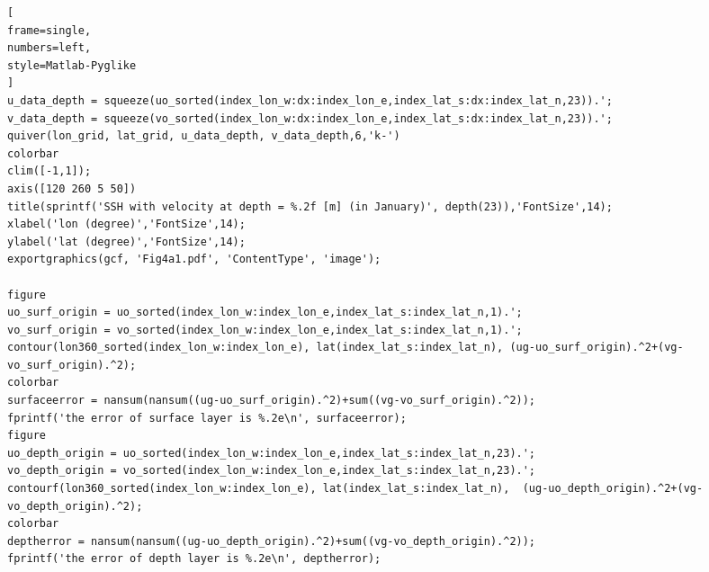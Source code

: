 \documentclass[12pt]{article}
\begin{document}
\begin{CJK*}{UTF8}{bsmi}
\begin{lstlisting}[
frame=single,
numbers=left,
style=Matlab-Pyglike
]
u_data_depth = squeeze(uo_sorted(index_lon_w:dx:index_lon_e,index_lat_s:dx:index_lat_n,23)).';
v_data_depth = squeeze(vo_sorted(index_lon_w:dx:index_lon_e,index_lat_s:dx:index_lat_n,23)).';
quiver(lon_grid, lat_grid, u_data_depth, v_data_depth,6,'k-')
colorbar
clim([-1,1]);
axis([120 260 5 50])
title(sprintf('SSH with velocity at depth = %.2f [m] (in January)', depth(23)),'FontSize',14);
xlabel('lon (degree)','FontSize',14);
ylabel('lat (degree)','FontSize',14);
exportgraphics(gcf, 'Fig4a1.pdf', 'ContentType', 'image');

figure
uo_surf_origin = uo_sorted(index_lon_w:index_lon_e,index_lat_s:index_lat_n,1).';
vo_surf_origin = vo_sorted(index_lon_w:index_lon_e,index_lat_s:index_lat_n,1).';
contour(lon360_sorted(index_lon_w:index_lon_e), lat(index_lat_s:index_lat_n), (ug-uo_surf_origin).^2+(vg-vo_surf_origin).^2);
colorbar
surfaceerror = nansum(nansum((ug-uo_surf_origin).^2)+sum((vg-vo_surf_origin).^2));
fprintf('the error of surface layer is %.2e\n', surfaceerror);
figure
uo_depth_origin = uo_sorted(index_lon_w:index_lon_e,index_lat_s:index_lat_n,23).';
vo_depth_origin = vo_sorted(index_lon_w:index_lon_e,index_lat_s:index_lat_n,23).';
contourf(lon360_sorted(index_lon_w:index_lon_e), lat(index_lat_s:index_lat_n),  (ug-uo_depth_origin).^2+(vg-vo_depth_origin).^2);
colorbar
deptherror = nansum(nansum((ug-uo_depth_origin).^2)+sum((vg-vo_depth_origin).^2));
fprintf('the error of depth layer is %.2e\n', deptherror);
\end{lstlisting}

\end{CJK*}
\end{document}
